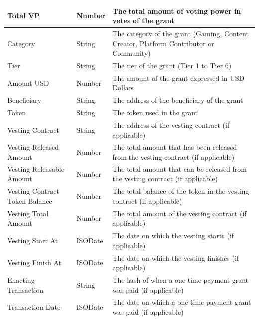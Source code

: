 \documentclass[MSE,Master,english]{twbook}%
\begin{document}
\begin{table}[H]
{\begin{tabular}{|l|l|l|}
  Total VP                       & Number  & The total amount of voting power in votes of the grant                                 \\ \hline
  Category                       & String  & The category of the grant (Gaming, Content Creator, Platform Contributor or Community) \\ \hline
  Tier                           & String  & The tier of the grant (Tier 1 to Tier 6)                                               \\ \hline
  Amount USD                     & Number  & The amount of the grant expressed in USD Dollars                                       \\ \hline
  Beneficiary                    & String  & The address of the beneficiary of the grant                                            \\ \hline
  Token                          & String  & The token used in the grant                                                            \\ \hline
  Vesting Contract               & String  & The address of the vesting contract (if applicable)                                    \\ \hline
  Vesting Released Amount        & Number  & The total amount that has been released from the vesting contract (if applicable)      \\ \hline
  Vesting Releasable Amount      & Number  & The total amount that can be released from the vesting contract (if applicable)        \\ \hline
  Vesting Contract Token Balance & Number  & The total balance of the token in the vesting contract (if applicable)                 \\ \hline
  Vesting Total Amount           & Number  & The total amount of the vesting contract (if applicable)                               \\ \hline
  Vesting Start At               & ISODate & The date on which the vesting starts (if applicable)                                   \\ \hline
  Vesting Finish At              & ISODate & The date on which the vesting finishes (if applicable)                                 \\ \hline
  Enacting Transaction           & String  & The hash of when a one-time-payment grant was paid (if applicable)                     \\ \hline
  Transaction Date               & ISODate & The date on which a one-time-payment grant was paid (if applicable)                    \\ \hline

\end{tabular}}
\end{table}
\end{document}
